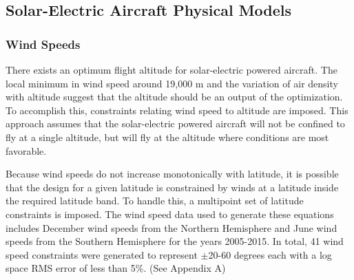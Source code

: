 \subsection{Solar-Electric Aircraft Physical Models}

\subsubsection{Wind Speeds}

There exists an optimum flight altitude for solar-electric powered aircraft.  
The local minimum in wind speed around 19,000 m and the variation of air density with altitude suggest that the altitude should be an output of the optimization. 
To accomplish this, constraints relating wind speed to altitude are imposed. 
This approach assumes that the solar-electric powered aircraft will not be confined to fly at a single altitude, but will fly at the altitude where conditions are most favorable.

Because wind speeds do not increase monotonically with latitude, it is possible that the design for a given latitude is constrained by winds at a latitude inside the required latitude band. 
To handle this, a multipoint set of latitude constraints is imposed. 
The wind speed data used to generate these equations includes December wind speeds from the Northern Hemisphere and June wind speeds from the Southern Hemisphere for the years 2005-2015.
In total, 41 wind speed constraints were generated to represent $\pm$20-60 degrees each with a log space RMS error of less than 5\%. (See Appendix A) 
% 
% 
% 

